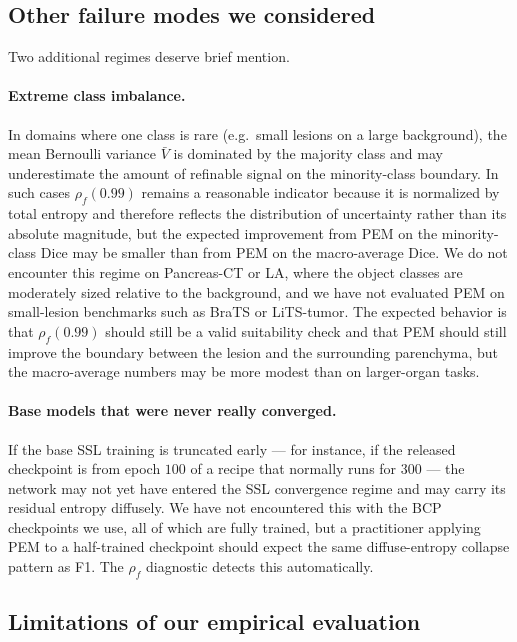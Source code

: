 \subsection{Other failure modes we considered}
\label{sec:disc:other}

Two additional regimes deserve brief mention.

\paragraph{Extreme class imbalance.}
In domains where one class is rare (e.g.\ small lesions on a large background), the mean Bernoulli variance $\bar V$ is dominated by the majority class and may underestimate the amount of refinable signal on the minority-class boundary. In such cases $\rho_f(0.99)$ remains a reasonable indicator because it is normalized by total entropy and therefore reflects the distribution of uncertainty rather than its absolute magnitude, but the expected improvement from PEM on the minority-class Dice may be smaller than from PEM on the macro-average Dice. We do not encounter this regime on Pancreas-CT or LA, where the object classes are moderately sized relative to the background, and we have not evaluated PEM on small-lesion benchmarks such as BraTS or LiTS-tumor. The expected behavior is that $\rho_f(0.99)$ should still be a valid suitability check and that PEM should still improve the boundary between the lesion and the surrounding parenchyma, but the macro-average numbers may be more modest than on larger-organ tasks.

\paragraph{Base models that were never really converged.}
If the base SSL training is truncated early --- for instance, if the released checkpoint is from epoch $100$ of a recipe that normally runs for $300$ --- the network may not yet have entered the SSL convergence regime and may carry its residual entropy diffusely. We have not encountered this with the BCP checkpoints we use, all of which are fully trained, but a practitioner applying PEM to a half-trained checkpoint should expect the same diffuse-entropy collapse pattern as F1. The $\rho_f$ diagnostic detects this automatically.

\subsection{Limitations of our empirical evaluation}
\label{sec:disc:limits}

